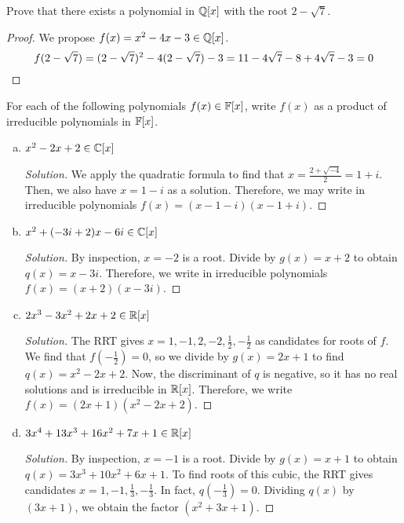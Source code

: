 \begin{recommended}
  Prove that there exists a polynomial in $\mathbb{Q}[x]$ with the root $2-\sqrt 7$.
\end{recommended}
\begin{proof}
  We propose $f(x) = x^2 - 4x - 3 \in \mathbb{Q}[x]$.
  \[ f(2-\sqrt{7}) = (2-\sqrt7)^2 - 4(2-\sqrt7) - 3 = 11 - 4\sqrt7 - 8 + 4\sqrt7 - 3 = 0 \qedhere \]
\end{proof}


\begin{recommended}
  For each of the following polynomials $f(x) \in \mathbb{F}[x]$,
  write $f(x)$ as a product of irreducible polynomials in $\mathbb{F}[x]$.
\end{recommended}
\begin{enumerate}[(a)]
  \item $x^2 - 2x + 2 \in \mathbb{C}[x]$
        \begin{proof}[Solution]
          We apply the quadratic formula to find that $x = \frac{2+\sqrt{-4}}{2} = 1+i$.
          Then, we also have $x = 1-i$ as a solution.
          Therefore, we may write in irreducible polynomials $f(x)=(x-1-i)(x-1+i)$.
        \end{proof}
  \item $x^2 + (-3i + 2)x - 6i \in \mathbb{C}[x]$
        \begin{proof}[Solution]
          By inspection, $x=-2$ is a root.
          Divide by $g(x)=x+2$ to obtain $q(x)=x-3i$.
          Therefore, we write in irreducible polynomials $f(x)=(x+2)(x-3i)$.
        \end{proof}
  \item $2x^3 - 3x^2 + 2x + 2 \in \mathbb{R}[x]$
        \begin{proof}[Solution]
          The RRT gives $x=1,-1,2,-2,\frac12,-\frac12$ as candidates for roots of $f$.
          We find that $f(-\frac12)=0$, so we divide by $g(x)=2x+1$ to find $q(x)=x^2-2x+2$.
          Now, the discriminant of $q$ is negative, so it has no real solutions and is irreducible in $\mathbb{R}[x]$.
          Therefore, we write $f(x)=(2x+1)(x^2-2x+2)$.
        \end{proof}
  \item $3x^4 + 13x^3 + 16x^2 + 7x + 1 \in \mathbb{R}[x]$
        \begin{proof}[Solution]
          By inspection, $x=-1$ is a root.
          Divide by $g(x)=x+1$ to obtain $q(x)=3x^3+10x^2+6x+1$.
          To find roots of this cubic, the RRT gives candidates $x=1,-1,\frac13,-\frac13$.
          In fact, $q(-\frac13)=0$.
          Dividing $q(x)$ by $(3x+1)$, we obtain the factor $(x^2+3x+1)$.

\end{proof}
\end{enumerate}
